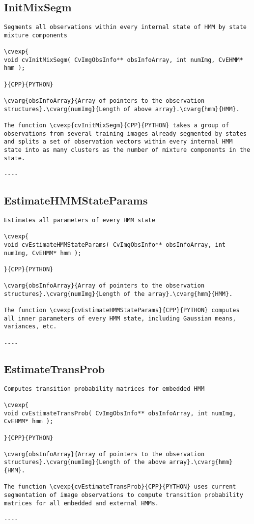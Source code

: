 \subsection{InitMixSegm}
\begin{verbatim}
Segments all observations within every internal state of HMM by state mixture components

\cvexp{
void cvInitMixSegm( CvImgObsInfo** obsInfoArray, int numImg, CvEHMM* hmm );

}{CPP}{PYTHON}

\cvarg{obsInfoArray}{Array of pointers to the observation structures}.\cvarg{numImg}{Length of above array}.\cvarg{hmm}{HMM}.

The function \cvexp{cvInitMixSegm}{CPP}{PYTHON} takes a group of observations from several training images already segmented by states and splits a set of observation vectors within every internal HMM state into as many clusters as the number of mixture components in the state.

----
\end{verbatim}
\subsection{EstimateHMMStateParams}
\begin{verbatim}
Estimates all parameters of every HMM state

\cvexp{
void cvEstimateHMMStateParams( CvImgObsInfo** obsInfoArray, int numImg, CvEHMM* hmm );

}{CPP}{PYTHON}

\cvarg{obsInfoArray}{Array of pointers to the observation structures}.\cvarg{numImg}{Length of the array}.\cvarg{hmm}{HMM}.

The function \cvexp{cvEstimateHMMStateParams}{CPP}{PYTHON} computes all inner parameters of every HMM state, including Gaussian means, variances, etc.

----
\end{verbatim}
\subsection{EstimateTransProb}
\begin{verbatim}
Computes transition probability matrices for embedded HMM

\cvexp{
void cvEstimateTransProb( CvImgObsInfo** obsInfoArray, int numImg, CvEHMM* hmm );

}{CPP}{PYTHON}

\cvarg{obsInfoArray}{Array of pointers to the observation structures}.\cvarg{numImg}{Length of the above array}.\cvarg{hmm}{HMM}.

The function \cvexp{cvEstimateTransProb}{CPP}{PYTHON} uses current segmentation of image observations to compute transition probability matrices for all embedded and external HMMs.

----
\end{verbatim}
